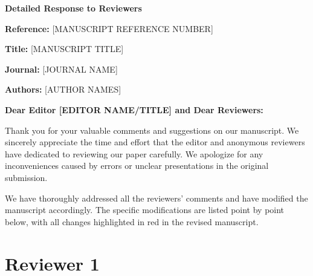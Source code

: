\documentclass[12pt]{article}
\begin{document}

\begin{center}
{\Large \textbf{Detailed Response to Reviewers}}
\end{center}

\bigskip


\textbf{Reference:} [MANUSCRIPT REFERENCE NUMBER]

\textbf{Title:} [MANUSCRIPT TITLE]

\textbf{Journal:} [JOURNAL NAME]

\textbf{Authors:} [AUTHOR NAMES]

\bigskip


\textbf{Dear Editor [EDITOR NAME/TITLE] and Dear Reviewers:}

Thank you for your valuable comments and suggestions on our manuscript. We sincerely appreciate the time and effort that the editor and anonymous reviewers have dedicated to reviewing our paper carefully. We apologize for any inconveniences caused by errors or unclear presentations in the original submission. 

We have thoroughly addressed all the reviewers' comments and have modified the manuscript accordingly. The specific modifications are listed point by point below, with all changes highlighted in red in the revised manuscript.


\section*{Reviewer 1}
\end{document}
